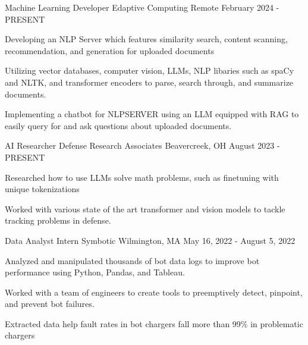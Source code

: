 
\begin{cventries}

  \cventry
  {Machine Learning Developer} %
  {Edaptive Computing} %
  {Remote} %
  {February 2024 - PRESENT} %
  {
    \begin{cvitems} %
      \item {Developing an NLP Server which features similarity search, content scanning, recommendation, and generation for uploaded documents}
      \item {Utilizing vector databases, computer vision, LLMs, NLP libaries such as spaCy and NLTK, and transformer encoders to parse, search through, and summarize documents.}
      \item {Implementing a chatbot for NLPSERVER using an LLM equipped with RAG to easily query for and ask questions about uploaded documents.}
    \end{cvitems}
  }

  \cventry
      {AI Researcher} %
      {Defense Research Associates} %
      {Beavercreek, OH} %
      {August 2023 - PRESENT} %
      {
        \begin{cvitems} %
          \item {Researched how to use LLMs solve math problems, such as finetuning with unique tokenizations}
          \item {Worked with various state of the art transformer and vision models to tackle tracking problems in defense.}
          \end{cvitems}
      }

  \cventry
      {Data Analyst Intern} %
      {Symbotic} %
      {Wilmington, MA} %
      {May 16, 2022 - August 5, 2022} %
      {
        \begin{cvitems} %
          \item {Analyzed and manipulated thousands of bot data logs to improve bot performance using Python, Pandas, and Tableau.}
          \item {Worked with a team of engineers to create tools to preemptively detect, pinpoint, and prevent bot failures.}
          \item {Extracted data help fault rates in bot chargers fall more than 99\% in problematic chargers}
        \end{cvitems}
      }


\end{cventries}
